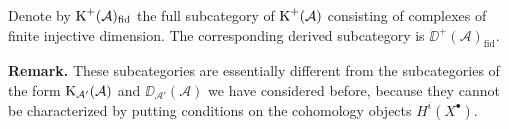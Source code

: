 \begin{definition*}
Denote by $\operatorname{K}^+(\mathcal{A})_{\mathrm{fid}}$ the full subcategory of $\operatorname{K}^+(\mathcal{A})$ consisting of complexes of finite injective dimension. The corresponding derived subcategory is $\DD^+(\mathcal{A})_{\mathrm{fid}}$.
\end{definition*}

\textbf{Remark.}
These subcategories are essentially different from the subcategories of the form $\operatorname{K}_{\mathcal{A}'}(\mathcal{A})$ and $\DD_{\mathcal{A}'}(\mathcal{A})$ we have considered before, because they cannot be characterized by putting conditions on the cohomology objects $H^i(X^\bullet)$.
